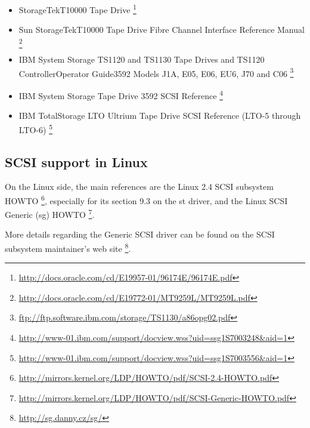 \begin{itemize}
\item{}StorageTek\texttrademark T10000 Tape Drive
       \footnote{ \href{http://docs.oracle.com/cd/E19957-01/96174E/96174E.pdf}
                       {http://docs.oracle.com/cd/E19957-01/96174E/96174E.pdf} }
\item{}Sun StorageTek\texttrademark T10000 Tape Drive Fibre Channel Interface Reference Manual
       \footnote{ \href{http://docs.oracle.com/cd/E19772-01/MT9259L/MT9259L.pdf}
                       {http://docs.oracle.com/cd/E19772-01/MT9259L/MT9259L.pdf} }
\item{}IBM System Storage TS1120 and TS1130 Tape Drives and TS1120 ControllerOperator Guide3592 Models J1A, E05, E06, EU6, J70 and C06
       \footnote{ \href{ftp://ftp.software.ibm.com/storage/TS1130/a86opg02.pdf}
                       {ftp://ftp.software.ibm.com/storage/TS1130/a86opg02.pdf} }
\item{}IBM System Storage Tape Drive 3592 SCSI Reference
       \footnote{ \href{http://www-01.ibm.com/support/docview.wss?uid=ssg1S7003248\&aid=1}
                       {http://www-01.ibm.com/support/docview.wss?uid=ssg1S7003248\&aid=1} }
\item{}IBM TotalStorage LTO Ultrium Tape Drive SCSI Reference  (LTO-5 through LTO-6)
       \footnote{ \href{http://www-01.ibm.com/support/docview.wss?uid=ssg1S7003556\&aid=1}
                       {http://www-01.ibm.com/support/docview.wss?uid=ssg1S7003556\&aid=1} }
\end{itemize}

\subsection{SCSI support in Linux}
On the Linux side, the main references are the Linux 2.4 SCSI subsystem HOWTO
       \footnote{ \href{http://mirrors.kernel.org/LDP/HOWTO/pdf/SCSI-2.4-HOWTO.pdf}
                       {http://mirrors.kernel.org/LDP/HOWTO/pdf/SCSI-2.4-HOWTO.pdf} },
especially for its section 9.3 on the st driver,
and the Linux SCSI Generic (sg) HOWTO 
       \footnote{ \href{http://mirrors.kernel.org/LDP/HOWTO/pdf/SCSI-Generic-HOWTO.pdf}
                       {http://mirrors.kernel.org/LDP/HOWTO/pdf/SCSI-Generic-HOWTO.pdf} }. 

More details regarding the Generic SCSI driver can be found on the SCSI subsystem maintainer's web site 
       \footnote{ \href{http://sg.danny.cz/sg/}{http://sg.danny.cz/sg/} }.

